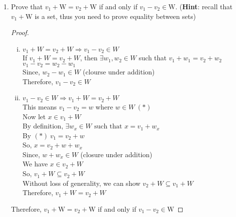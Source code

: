 \documentclass[11pt]{scrartcl}
\begin{document}
\begin{enumerate}[label=\alph*.]
	\item{
	      Prove that \(v_{1}+\mathrm{W}=v_{2}+\mathrm{W}\) if and only if \(v_{1}-v_{2} \in \mathrm{W}\).
	      (\textbf{Hint}: recall that $v_{1}+\mathrm{W}$ is a set, thus you need to prove equality between sets)
	      \begin{proof}\-\
		      \begin{enumerate}[i.]
			      \item{
			            $v_1 + W = v_2 + W \Rightarrow v_1 - v_2 \in W$\\
			            If $v_1 + W = v_2 + W$, then $\exists w_1, w_2 \in W$ such that
			            $v_1 + w_1 = v_2 + w_2$\\
			            $v_1 - v_2 = w_2 - w_1$\\
			            Since, $w_2 - w_1 \in W$ (clourse under addition)\\
			            Therefore, $v_1 - v_2 \in W$
			            }
			      \item{
			            $v_1 - v_2 \in W \Rightarrow v_1 + W = v_2 + W $\\
			            This means $v_1 - v_2 = w$ where $w \in W \ (*)$\\
			            Now let $x \in v_1 + W$\\
			            By definition, $\exists w_x \in W \text{ such that } x = v_1 + w_x$\\
			            By $(*) \ v_1 = v_2 + w$\\
			            So, $x = v_2 + w + w_x$\\
			            Since, $w + w_x \in W$ (closure under addition)\\
			            We have $x \in v_2 + W$\\
			            So, $v_1 + W \subseteq v_2 + W$\\
			            Without loss of generality, we can show $v_2 + W \subseteq v_1 + W$\\
			            Therefore, $v_1 + W = v_2 + W$
			            }
		      \end{enumerate}
		      Therefore, \(v_{1}+\mathrm{W}=v_{2}+\mathrm{W}\) if and only if \(v_{1}-v_{2} \in \mathrm{W}\)
	      \end{proof}
	      }


\end{enumerate}
\end{document}
